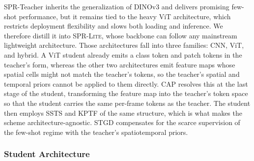 SPR-Teacher inherits the generalization of DINOv3 and delivers promising few-shot
performance, but it remains tied to the heavy ViT architecture, which restricts deployment
flexibility and slows both loading and inference.
We therefore distill it into \textsc{SPR-Lite}, whose backbone can follow any mainstream
lightweight architecture.
Those architectures fall into three families: CNN, ViT, and hybrid.
A ViT student already emits a class token and patch tokens in the teacher's form, whereas the other
two architectures emit feature maps whose spatial cells might not match the teacher's tokens,
so the teacher's spatial and temporal priors cannot be applied to them directly.
CAP resolves this at the last stage of the student, transforming the feature map into the teacher's
token space so that the student carries the same per-frame tokens as the teacher.
The student then employs SSTS and KPTF of the same structure, which is what makes the scheme
architecture-agnostic.
STGD compensates for the scarce supervision of the few-shot regime with the teacher's
spatiotemporal priors.

\subsubsection{Student Architecture}
\label{sec:method:distill:student}

